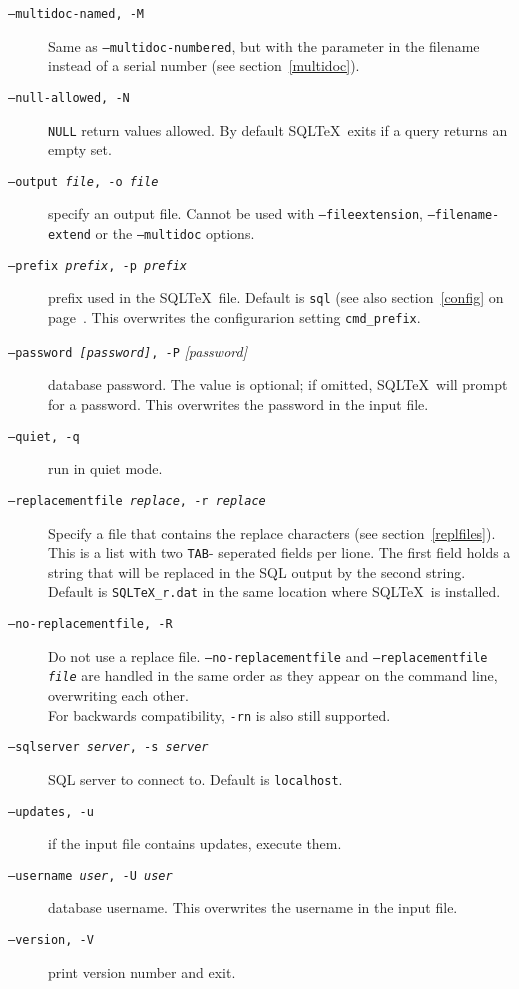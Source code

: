 \documentclass{article}
\begin{document}
\begin{description}
\item[\texttt{--multidoc-named, -M}] Same as \texttt{--multidoc-numbered}, but with the parameter in the filename instead of a serial number (see section~\ref{multidoc}).

\item[\texttt{--null-allowed, -N}] \texttt{NULL} return values allowed. By default SQL\TeX\ exits if a
query returns an empty set.

\item[\texttt{--output \textit{file}, -o \textit{file}}] specify an output file. Cannot be used with \texttt{--fileextension},
\texttt{--filename-extend} or the  \texttt{--multidoc} options.

\item[\texttt{--prefix \textit{prefix}, -p \textit{prefix}}] prefix used in the SQL\TeX\ file. Default is \texttt{sql} (see also section~\ref{config}
on page~\pageref{prefix}. This overwrites the configurarion setting \texttt{cmd\_prefix}.

\item[\texttt{--password \textit{[password]}, -P} \textit{[password]}] database password. The value is optional; if omitted, SQL\TeX\ will prompt for a password. This overwrites the password in the input file.\\

\item[\texttt{--quiet, -q}] run in quiet mode.

\item[\texttt{--replacementfile \textit{replace}, -r \textit{replace}}] Specify a file that contains the replace characters (see section~\ref{replfiles}). This is
a list with two \texttt{TAB}- seperated fields per lione. The first field holds a string that will be replaced in the SQL output by the second string.\\
Default is \texttt{SQLTeX{\_}r.dat} in the same location where SQL\TeX\ is installed.

\item[\texttt{--no-replacementfile, -R}] Do not use a replace file. \texttt{--no-replacementfile} and \texttt{--replacementfile \textit{file}} are handled in the same order as
they appear on the command line, overwriting each other.\\
For backwards compatibility, \texttt{-rn} is also still supported.

\item[\texttt{--sqlserver \textit{server}, -s \textit{server}}] SQL server to connect to. Default is \texttt{localhost}.

\item[\texttt{--updates, -u}] if the input file contains updates, execute them.

\item[\texttt{--username \textit{user}, -U \textit{user}}] database username. This overwrites the username in the input file.

\item[\texttt{--version, -V}] print version number and exit.
\end{description}
\end{document}

